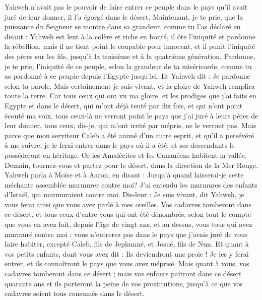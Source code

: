 \begin{multicols}{2}
Yahweh n'avait pas le pouvoir de faire entrer ce peuple dans le pays qu'il avait juré de leur donner, il l'a égorgé dans le désert.
Maintenant, je te prie, que la puissance du Seigneur se montre dans sa grandeur, comme tu l'as déclaré en disant :
Yahweh est lent à la colère et riche en bonté, il ôte l'iniquité et pardonne la rébellion, mais il ne tient point le coupable pour innocent, et il punit l'iniquité des pères sur les fils, jusqu'à la troisième et à la quatrième génération.
Pardonne, je te prie, l'iniquité de ce peuple, selon la grandeur de ta miséricorde, comme tu as pardonné à ce peuple depuis l'Egypte jusqu'ici.
Et Yahweh dit : Je pardonne selon ta parole.
Mais certainement je suis vivant, et la gloire de Yahweh remplira toute la terre.
Car tous ceux qui ont vu ma gloire, et les prodiges que j'ai faits en Egypte et dans le désert, qui m'ont déjà tenté par dix fois, et qui n'ont point écouté ma voix,
tous ceux-là ne verront point le pays que j'ai juré à leurs pères de leur donner, tous ceux, dis-je, qui m'ont irrité par mépris, ne le verront pas.
Mais parce que mon serviteur Caleb a été animé d'un autre esprit, et qu'il a persévéré à me suivre, je le ferai entrer dans le pays où il a été, et ses descendants le posséderont en héritage.
Or les Amalécites et les Cananéens habitent la vallée. Demain, tournez-vous et partez pour le désert, dans la direction de la Mer Rouge.
Yahweh parla à Moïse et à Aaron, en disant :
Jusqu'à quand laisserai-je cette méchante assemblée murmurer contre moi? J'ai entendu les murmures des enfants d'Israël, qui murmuraient contre moi.
Dis-leur : Je suis vivant, dit Yahweh, je vous ferai ainsi que vous avez parlé à mes oreilles.
Vos cadavres tomberont dans ce désert, et tous ceux d’entre vous qui ont été dénombrés, selon tout le compte que vous en avez fait, depuis l’âge de vingt ans, et au dessus, vous tous qui avez murmuré contre moi ;
vous n'entrerez pas dans le pays que j'avais juré de vous faire habiter, excepté Caleb, fils de Jephunné, et Josué, fils de Nun.
Et quant à vos petits enfants, dont vous avez dit : Ils deviendront une proie ! Je les y ferai entrer, et ils connaîtront le pays que vous avez méprisé.
Mais quant à vous, vos cadavres tomberont dans ce désert ;
mais vos enfants paîtront dans ce désert quarante ans et ils porteront la peine de vos prostitutions, jusqu'à ce que vos cadavres soient tous consumés dans le désert.

\end{multicols}
